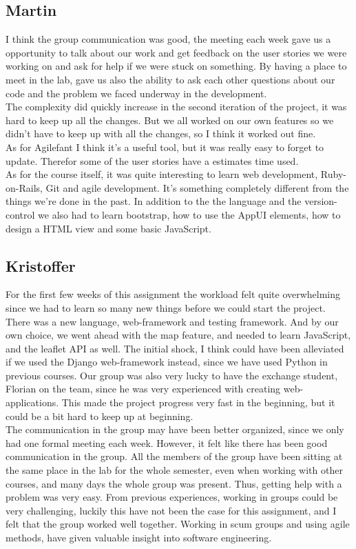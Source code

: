 \documentclass[a4paper]{article}
\begin{document}
\subsection{Martin}
I think the group communication was good, the meeting each week gave us a opportunity to talk about our work and get feedback on the user stories we were working on and ask for help if we were stuck on something. By having a place to meet in the lab, gave us also the ability to ask each other questions about our code and the problem we faced underway in the development. \\ 
The complexity did quickly increase in the second iteration of the project, it was hard to keep up all the changes. But we all worked on our own features so we didn't have to keep up with all the changes, so I think it worked out fine. \\
As for Agilefant I think it's a useful tool, but it was really easy to forget to update. Therefor some of the user stories have a estimates time used. \\

\noindent
As for the course itself, it was quite interesting to learn web development, Ruby-on-Rails, Git and agile development. It's something completely different from the things we're done in the past. In addition to the the language and the version-control we also had to learn bootstrap, how to use the AppUI elements, how to design a HTML view and some basic JavaScript. 



\subsection{Kristoffer}
\noindent
For the first few weeks of this assignment the workload felt quite overwhelming since we had to learn so many new things before we could start the project. There was a new language, web-framework and testing framework. And by our own choice, we went ahead with the map feature, and needed to learn JavaScript, and the leaflet API as well.  
The initial shock, I think could have been alleviated if we used the Django web-framework instead, since we have used Python in previous courses.
Our group was also very lucky to have the exchange student, Florian on the team, since he was very experienced with creating web-applications. This made the project progress very fast in the beginning, but it could be a bit hard to keep up at beginning. \\

\noindent
The communication in the group may have been better organized, since we only had one formal meeting each week. However, it felt like there has been good communication in the group. All the members of the group have been sitting at the same place in the lab for the whole semester, even when working with other courses, and many days the whole group was present. Thus, getting help with a problem was very easy.
From previous experiences, working in groups could be very challenging, luckily this have not been the case for this assignment, and I felt that the group worked well together. Working in scum groups and using agile methods, have given valuable insight into software engineering.  \\
\end{document}
